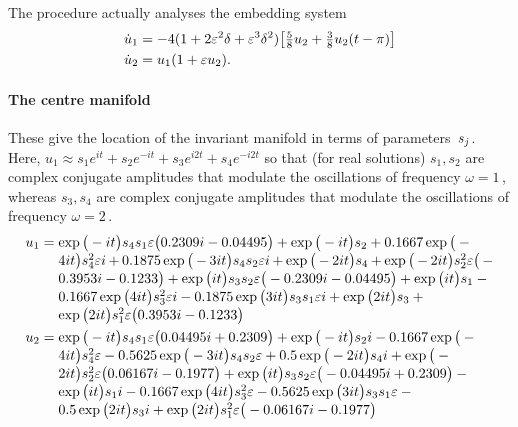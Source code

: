 The procedure actually analyses the embedding system
\begin{align*}&
\dot u_{1}=-4(1+2\varepsilon^2\delta+\varepsilon^3\delta^2)\big[\tfrac58u_2+\tfrac38u_2(t-\pi)\big]
\\&
\dot u_{2}= u_1(1+ \varepsilon u_2).
\end{align*}



\paragraph{The centre manifold} 
These give the location of the invariant manifold in
terms of parameters~\(s\sb j\).
Here, \(u_1\approx s_1e^{it}+s_2e^{-it}+s_3e^{i2t}+s_4e^{-i2t}\) so that (for real solutions) \(s_1,s_2\) are complex conjugate amplitudes that modulate the oscillations of frequency \(\omega=1\)\,, whereas \(s_3,s_4\) are complex conjugate amplitudes that modulate the oscillations of frequency \(\omega=2\)\,.
\begin{align*}&
u_{1}=\ParMath{\exp \big(-i t\big) s_{4} s_{1} \eps \big(0.2309 i-0.04495
\big)+\exp \big(-i t\big) s_{2}+0.1667 \exp \big(-4 i t\big) s_{4}^{2}
 \eps i+0.1875 \exp \big(-3 i t\big) s_{4} s_{2} \eps i+\exp \big(-2 i t
\big) s_{4}+\exp \big(-2 i t\big) s_{2}^{2} \eps \big(-0.3953 i-
0.1233\big)+\exp \big(i t\big) s_{3} s_{2} \eps \big(-0.2309 i-
0.04495\big)+\exp \big(i t\big) s_{1}-0.1667 \exp \big(4 i t\big) s_
{3}^{2} \eps i-0.1875 \exp \big(3 i t\big) s_{3} s_{1} \eps i+\exp \big(
2 i t\big) s_{3}+\exp \big(2 i t\big) s_{1}^{2} \eps \big(0.3953 i-
0.1233\big)}
\\&
u_{2}=\ParMath{\exp \big(-i t\big) s_{4} s_{1} \eps \big(0.04495 i+0.2309
\big)+\exp \big(-i t\big) s_{2} i-0.1667 \exp \big(-4 i t\big) s_{4}^{
2} \eps-0.5625 \exp \big(-3 i t\big) s_{4} s_{2} \eps+0.5 \exp \big(-2 i
 t\big) s_{4} i+\exp \big(-2 i t\big) s_{2}^{2} \eps \big(0.06167 i-
0.1977\big)+\exp \big(i t\big) s_{3} s_{2} \eps \big(-0.04495 i+
0.2309\big)-\exp \big(i t\big) s_{1} i-0.1667 \exp \big(4 i t\big) s
_{3}^{2} \eps-0.5625 \exp \big(3 i t\big) s_{3} s_{1} \eps-0.5 \exp 
\big(2 i t\big) s_{3} i+\exp \big(2 i t\big) s_{1}^{2} \eps \big(-
0.06167 i-0.1977\big)}
\end{align*}

 
